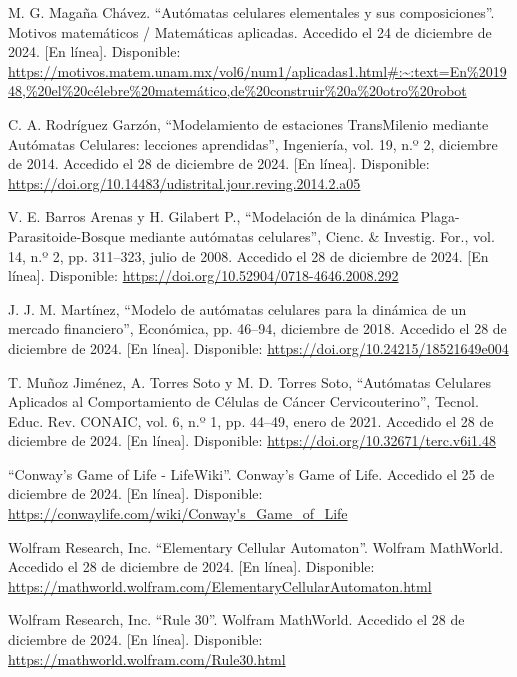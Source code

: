 \documentclass[12pt,twoside]{article}
\begin{document}
	\begin{thebibliography}{99}
		M. G. Magaña Chávez. ``Autómatas celulares elementales y sus composiciones''. Motivos matemáticos / Matemáticas aplicadas. Accedido el 24 de diciembre de 2024. [En línea]. Disponible: \url{https://motivos.matem.unam.mx/vol6/num1/aplicadas1.html#:~:text=En%201948,%20el%20célebre%20matemático,de%20construir%20a%20otro%20robot}
		
		C. A. Rodríguez Garzón, ``Modelamiento de estaciones TransMilenio mediante Autómatas Celulares: lecciones aprendidas'', Ingeniería, vol. 19, n.º 2, diciembre de 2014. Accedido el 28 de diciembre de 2024. [En línea]. Disponible: \url{https://doi.org/10.14483/udistrital.jour.reving.2014.2.a05}
		
		V. E. Barros Arenas y H. Gilabert P., ``Modelación de la dinámica Plaga-Parasitoide-Bosque mediante autómatas celulares'', Cienc. \& Investig. For., vol. 14, n.º 2, pp. 311–323, julio de 2008. Accedido el 28 de diciembre de 2024. [En línea]. Disponible: \url{https://doi.org/10.52904/0718-4646.2008.292}
		
		J. J. M. Martínez, ``Modelo de autómatas celulares para la dinámica de un mercado financiero'', Económica, pp. 46–94, diciembre de 2018. Accedido el 28 de diciembre de 2024. [En línea]. Disponible: \url{https://doi.org/10.24215/18521649e004}
		
		T. Muñoz Jiménez, A. Torres Soto y M. D. Torres Soto, ``Autómatas Celulares Aplicados al Comportamiento de Células de Cáncer Cervicouterino'', Tecnol. Educ. Rev. CONAIC, vol. 6, n.º 1, pp. 44–49, enero de 2021. Accedido el 28 de diciembre de 2024. [En línea]. Disponible: \url{https://doi.org/10.32671/terc.v6i1.48}
		
		``Conway's Game of Life - LifeWiki''. Conway's Game of Life. Accedido el 25 de diciembre de 2024. [En línea]. Disponible: \url{https://conwaylife.com/wiki/Conway's_Game_of_Life}
		
		Wolfram Research, Inc. ``Elementary Cellular Automaton''. Wolfram MathWorld. Accedido el 28 de diciembre de 2024. [En línea]. Disponible: \url{https://mathworld.wolfram.com/ElementaryCellularAutomaton.html}
		
		Wolfram Research, Inc. ``Rule 30''. Wolfram MathWorld. Accedido el 28 de diciembre de 2024. [En línea]. Disponible: \url{https://mathworld.wolfram.com/Rule30.html}
		
	\end{thebibliography}
	
\end{document}
